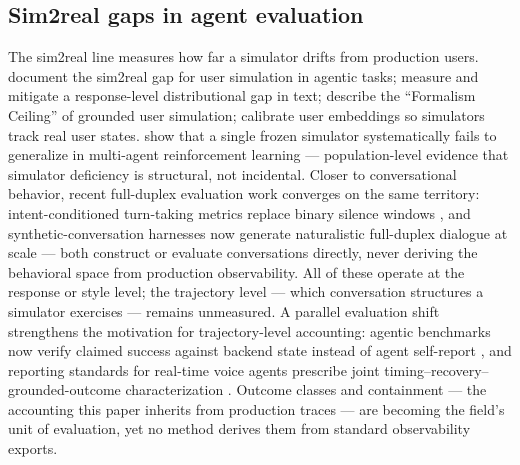 \subsection{Sim2real gaps in agent evaluation}
The sim2real line measures how far a simulator drifts from production users.
\citet{sim2realAgentic2026} document the sim2real gap for user simulation in agentic tasks;
\citet{distributionalGap2026} measure and mitigate a response-level distributional gap in
text; \citet{realUserSim2026} describe the ``Formalism Ceiling'' of grounded user simulation;
\citet{cue2026} calibrate user embeddings so simulators track real user states.
\citet{simulatorCollapse2026} show that a single frozen simulator systematically fails to
generalize in multi-agent reinforcement learning --- population-level evidence that simulator
deficiency is structural, not incidental.
Closer to conversational behavior, recent full-duplex evaluation work converges on the same
territory: intent-conditioned turn-taking metrics replace binary silence windows
\citep{intentConditioned2026}, and synthetic-conversation harnesses now generate naturalistic
full-duplex dialogue at scale \citep{syntheticDuplex2026} --- both construct or evaluate
conversations directly, never deriving the behavioral space from production observability.
All of these operate at the response or style level; the trajectory level --- which
conversation structures a simulator exercises --- remains unmeasured.
A parallel evaluation shift strengthens the motivation for trajectory-level accounting: agentic
benchmarks now verify claimed success against backend state instead of agent self-report
\citep{vamosBench2026}, and reporting standards for real-time voice agents prescribe joint
timing--recovery--grounded-outcome characterization \citep{trgSurvey2026}. Outcome classes and
containment --- the accounting this paper inherits from production traces --- are becoming the
field's unit of evaluation, yet no method derives them from standard observability exports.

